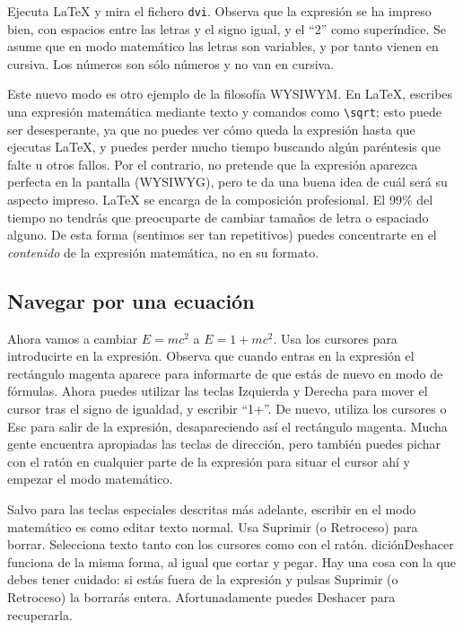 Ejecuta \LaTeX{} y mira el fichero \texttt{dvi}. Observa que la expresión
se ha impreso bien, con espacios entre las letras y el signo igual,
y el {}``2'' como superíndice. Se asume que en modo matemático las
letras son variables, y por tanto vienen en cursiva. Los números son
sólo números y no van en cursiva.

Este nuevo modo es otro ejemplo de la filosofía WYSIWYM. En \LaTeX{},
escribes una expresión matemática mediante texto y comandos como \texttt{\textbackslash{}sqrt};
esto puede ser desesperante, ya que no puedes ver cómo queda la expresión
hasta que ejecutas \LaTeX{}, y puedes perder mucho tiempo buscando
algún paréntesis que falte u otros fallos. Por el contrario, \LyX{}
no pretende que la expresión aparezca perfecta en la pantalla (WYSIWYG),
pero te da una buena idea de cuál será su aspecto impreso. \LaTeX{}
se encarga de la composición profesional. El 99\% del tiempo no tendrás
que preocuparte de cambiar tamaños de letra o espaciado alguno. De
esta forma (sentimos ser tan repetitivos) puedes concentrarte en el
\emph{contenido} de la expresión matemática, no en su formato.


\subsection{Navegar por una ecuación}

Ahora vamos a cambiar $E=mc^{2}$ a $E=1+mc^{2}$. Usa los cursores
para introducirte en la expresión. Observa que cuando entras en la
expresión el rectángulo magenta aparece para informarte de que estás
de nuevo en modo de fórmulas. Ahora puedes utilizar las teclas \textsf{Izquierda}
y \textsf{Derecha} para mover el cursor tras el signo de igualdad,
y escribir {}``1+''. De nuevo, utiliza los cursores o \textsf{Esc}
para salir de la expresión, desapareciendo así el rectángulo magenta.
Mucha gente encuentra apropiadas las teclas de dirección, pero también
puedes pichar con el ratón en cualquier parte de la expresión para
situar el cursor ahí y empezar el modo matemático.

Salvo para las teclas especiales descritas más adelante, escribir
en el modo matemático es como editar texto normal. Usa \textsf{Suprimir}
(o \textsf{Retroceso}) para borrar. Selecciona texto tanto con los
cursores como con el ratón. \textsf{}\textsf{dición\lyxarrow{}Deshacer}
funciona de la misma forma, al igual que cortar y pegar. Hay una cosa
con la que debes tener cuidado: si estás fuera de la expresión y pulsas
\textsf{Suprimir} (o \textsf{Retroceso}) la borrarás entera. Afortunadamente
puedes \textsf{Deshacer} para recuperarla.

